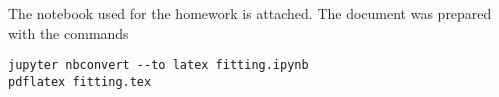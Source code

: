 \documentclass{article}
\begin{document}


The notebook used for the homework is attached.
The document was prepared with the commands
\begin{verbatim}
jupyter nbconvert --to latex fitting.ipynb
pdflatex fitting.tex
\end{verbatim}


\end{document}
